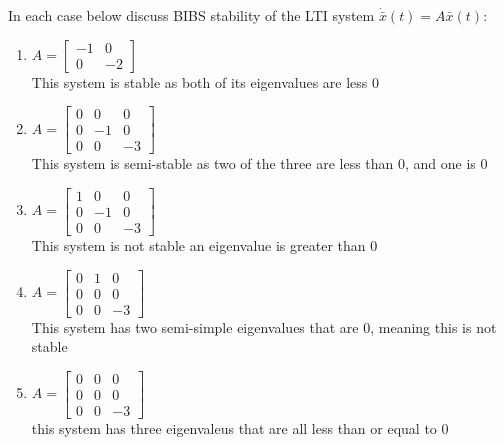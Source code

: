 \item In each case below discuss BIBS stability of the LTI system $\dot {\bar x}(t) = A\bar x(t)$:
  \begin{enumerate}
  \item $A = \begin{bmatrix} -1 & 0 \\ 0 & -2 \end{bmatrix}$ \\
    This system is stable as both of its eigenvalues are less 0
  \item $A = \begin{bmatrix} 0 & 0 & 0\\ 0 & -1 & 0\\ 0 & 0 & -3 \end{bmatrix}$\\
    This system is semi-stable as two of the three are less than 0, and one is 0
  \item $A = \begin{bmatrix} 1 & 0 & 0\\ 0 & -1 & 0\\ 0 & 0 & -3 \end{bmatrix}$\\
    This system is not stable an eigenvalue is greater than 0
  \item $A = \begin{bmatrix} 0 & 1 & 0\\ 0 & 0 & 0\\ 0 & 0 & -3 \end{bmatrix}$\\
    This system has two semi-simple eigenvalues that are 0, meaning this is not stable
  \item $A = \begin{bmatrix} 0 & 0 & 0\\ 0 & 0 & 0\\ 0 & 0 & -3 \end{bmatrix}$\\
    this system has three eigenvaleus that are all less than or equal to 0
  \end{enumerate}